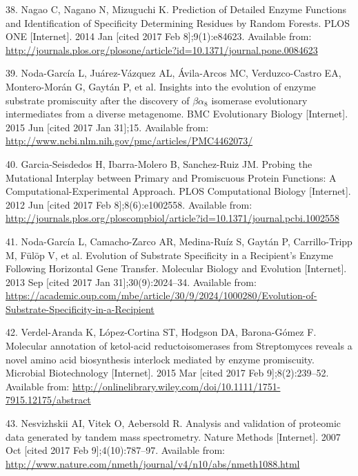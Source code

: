 \documentclass[12pt,twoside]{reedthesis}
\begin{document}
  \hypertarget{ref-nagao_prediction_2014}{}
  38. Nagao C, Nagano N, Mizuguchi K. Prediction of Detailed Enzyme
  Functions and Identification of Specificity Determining Residues by
  Random Forests. PLOS ONE {[}Internet{]}. 2014 Jan {[}cited 2017 Feb
  8{]};9(1):e84623. Available from:
  \url{http://journals.plos.org/plosone/article?id=10.1371/journal.pone.0084623}
  
  \hypertarget{ref-noda-garcia_insights_2015}{}
  39. Noda-García L, Juárez-Vázquez AL, Ávila-Arcos MC, Verduzco-Castro
  EA, Montero-Morán G, Gaytán P, et al. Insights into the evolution of
  enzyme substrate promiscuity after the discovery of \(\beta\alpha_8\)
  isomerase evolutionary intermediates from a diverse metagenome. BMC
  Evolutionary Biology {[}Internet{]}. 2015 Jun {[}cited 2017 Jan
  31{]};15. Available from:
  \url{http://www.ncbi.nlm.nih.gov/pmc/articles/PMC4462073/}
  
  \hypertarget{ref-garcia-seisdedos_probing_2012}{}
  40. Garcia-Seisdedos H, Ibarra-Molero B, Sanchez-Ruiz JM. Probing the
  Mutational Interplay between Primary and Promiscuous Protein Functions:
  A Computational-Experimental Approach. PLOS Computational Biology
  {[}Internet{]}. 2012 Jun {[}cited 2017 Feb 8{]};8(6):e1002558. Available
  from:
  \url{http://journals.plos.org/ploscompbiol/article?id=10.1371/journal.pcbi.1002558}
  
  \hypertarget{ref-noda-garcia_evolution_2013}{}
  41. Noda-García L, Camacho-Zarco AR, Medina-Ruíz S, Gaytán P,
  Carrillo-Tripp M, Fülöp V, et al. Evolution of Substrate Specificity in
  a Recipient's Enzyme Following Horizontal Gene Transfer. Molecular
  Biology and Evolution {[}Internet{]}. 2013 Sep {[}cited 2017 Jan
  31{]};30(9):2024--34. Available from:
  \url{https://academic.oup.com/mbe/article/30/9/2024/1000280/Evolution-of-Substrate-Specificity-in-a-Recipient}
  
  \hypertarget{ref-verdel-aranda_molecular_2015}{}
  42. Verdel-Aranda K, López-Cortina ST, Hodgson DA, Barona-Gómez F.
  Molecular annotation of ketol-acid reductoisomerases from Streptomyces
  reveals a novel amino acid biosynthesis interlock mediated by enzyme
  promiscuity. Microbial Biotechnology {[}Internet{]}. 2015 Mar {[}cited
  2017 Feb 9{]};8(2):239--52. Available from:
  \url{http://onlinelibrary.wiley.com/doi/10.1111/1751-7915.12175/abstract}
  
  \hypertarget{ref-nesvizhskii_analysis_2007}{}
  43. Nesvizhskii AI, Vitek O, Aebersold R. Analysis and validation of
  proteomic data generated by tandem mass spectrometry. Nature Methods
  {[}Internet{]}. 2007 Oct {[}cited 2017 Feb 9{]};4(10):787--97. Available
  from:
  \url{http://www.nature.com/nmeth/journal/v4/n10/abs/nmeth1088.html}
  
\end{document}
